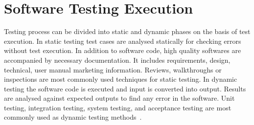 {%




\section{Software Testing Execution}
Testing process can be divided into static and dynamic phases on the basis of test execution. In static testing test cases are analysed statically for checking errors without test execution. In addition to software code, high quality softwares are accompanied by necessary documentation. It includes requirements, design, technical, user manual marketing information. Reviews, walkthroughs or inspections are most commonly used techniques for static testing. In dynamic testing the software code is executed and input is converted into output. Results are analysed against expected outputs to find any error in the software. Unit testing, integration testing, system testing, and acceptance testing are most commonly used as dynamic testing methods~\cite{fairley1978tutorial}.

}
